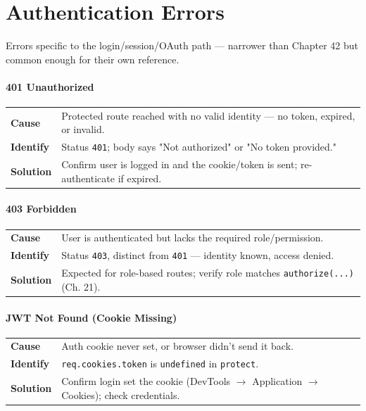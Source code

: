\chapter{Authentication Errors}

\begin{notebox}[NOTE]
Errors specific to the login/session/OAuth path --- narrower than Chapter 42 but common enough for their own reference.
\end{notebox}

\subsubsection*{401 Unauthorized}
\noindent\begin{tabularx}{\textwidth}{@{}>{\bfseries}p{2.3cm}X@{}}
\toprule
Cause & Protected route reached with no valid identity --- no token, expired, or invalid. \\
Identify & Status \texttt{401}; body says "Not authorized" or "No token provided." \\
Solution & Confirm user is logged in and the cookie/token is sent; re-authenticate if expired. \\
\bottomrule
\end{tabularx}

\subsubsection*{403 Forbidden}
\noindent\begin{tabularx}{\textwidth}{@{}>{\bfseries}p{2.3cm}X@{}}
\toprule
Cause & User is authenticated but lacks the required role/permission. \\
Identify & Status \texttt{403}, distinct from \texttt{401} --- identity known, access denied. \\
Solution & Expected for role-based routes; verify role matches \texttt{authorize(...)} (Ch. 21). \\
\bottomrule
\end{tabularx}

\subsubsection*{JWT Not Found (Cookie Missing)}
\noindent\begin{tabularx}{\textwidth}{@{}>{\bfseries}p{2.3cm}X@{}}
\toprule
Cause & Auth cookie never set, or browser didn't send it back. \\
Identify & \texttt{req.cookies.token} is \texttt{undefined} in \texttt{protect}. \\
Solution & Confirm login set the cookie (DevTools $\to$ Application $\to$ Cookies); check credentials. \\
\bottomrule
\end{tabularx}

